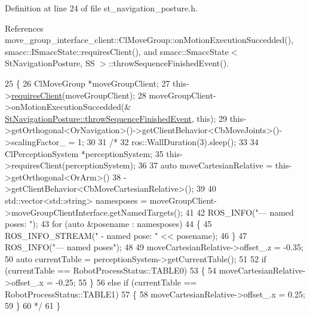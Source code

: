 Definition at line 24 of file st\+\_\+navigation\+\_\+posture.\+h.



References move\+\_\+group\+\_\+interface\+\_\+client\+::\+Cl\+Move\+Group\+::on\+Motion\+Execution\+Succedded(), smacc\+::\+I\+Smacc\+State\+::requires\+Client(), and smacc\+::\+Smacc\+State$<$ St\+Navigation\+Posture, S\+S $>$\+::throw\+Sequence\+Finished\+Event().


\begin{DoxyCode}
25     \{
26         ClMoveGroup *moveGroupClient;
27         this->\hyperlink{classsmacc_1_1ISmaccState_a7f95c9f0a6ea2d6f18d1aec0519de4ac}{requiresClient}(moveGroupClient);
28         moveGroupClient->onMotionExecutionSuccedded(&
      \hyperlink{classsmacc_1_1SmaccState_a49dcfc25824f7e083dd4b999c49ab2b6}{StNavigationPosture::throwSequenceFinishedEvent}, \textcolor{keyword}{this});
29         this->getOrthogonal<OrNavigation>()->getClientBehavior<CbMoveJoints>()->scalingFactor\_ = 1;
30 
31         \textcolor{comment}{/*}
32 \textcolor{comment}{        ros::WallDuration(3).sleep();}
33 \textcolor{comment}{}
34 \textcolor{comment}{        ClPerceptionSystem *perceptionSystem;}
35 \textcolor{comment}{        this->requiresClient(perceptionSystem);}
36 \textcolor{comment}{}
37 \textcolor{comment}{        auto moveCartesianRelative = this->getOrthogonal<OrArm>()}
38 \textcolor{comment}{                                         ->getClientBehavior<CbMoveCartesianRelative>();}
39 \textcolor{comment}{}
40 \textcolor{comment}{        std::vector<std::string> namesposes = moveGroupClient->moveGroupClientInterface.getNamedTargets();}
41 \textcolor{comment}{}
42 \textcolor{comment}{        ROS\_INFO("--- named poses: ");}
43 \textcolor{comment}{        for (auto &posename : namesposes)}
44 \textcolor{comment}{        \{}
45 \textcolor{comment}{            ROS\_INFO\_STREAM(" - named pose: " << posename);}
46 \textcolor{comment}{        \}}
47 \textcolor{comment}{        ROS\_INFO("--- named poses");}
48 \textcolor{comment}{}
49 \textcolor{comment}{        moveCartesianRelative->offset\_.z = -0.35;}
50 \textcolor{comment}{        auto currentTable = perceptionSystem->getCurrentTable();}
51 \textcolor{comment}{}
52 \textcolor{comment}{        if (currentTable == RobotProcessStatus::TABLE0)}
53 \textcolor{comment}{        \{}
54 \textcolor{comment}{            moveCartesianRelative->offset\_.x = -0.25;}
55 \textcolor{comment}{        \}}
56 \textcolor{comment}{        else if (currentTable == RobotProcessStatus::TABLE1)}
57 \textcolor{comment}{        \{}
58 \textcolor{comment}{            moveCartesianRelative->offset\_.x = 0.25;}
59 \textcolor{comment}{        \}}
60 \textcolor{comment}{    */}
61     \}
\end{DoxyCode}
